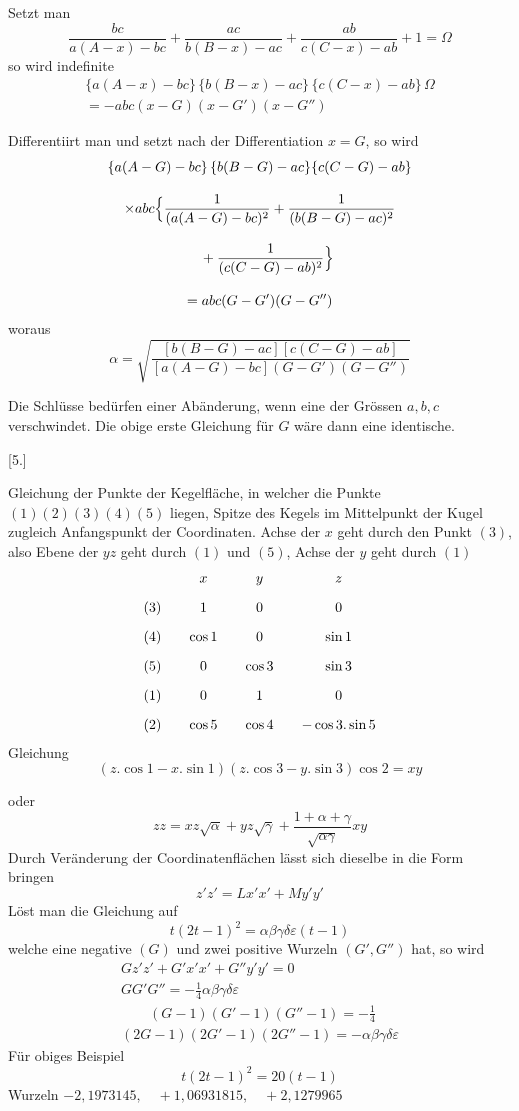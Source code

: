 
Setzt man
\[
\frac{bc}{a(A-x)-bc}+\frac{ac}{b(B-x)-ac}+\frac{ab}{c(C-x)-ab}+1=\Omega
\]
so wird indefinite
\[
\begin{gathered} \{a(A-x)-bc\}\,\{b(B-x)-ac\}\,\{c(C-x)-ab\}\,\Omega\\[9pt] =-abc(x-G)(x-G')(x-G'') \end{gathered}
\]

Differentiirt man und setzt nach der Differentiation $x=G$, so wird
\[
\begin{gathered} \{a(A-G)-bc\}\,\{b(B-G)-ac\}\{c(C-G)-ab\}\\[9pt] \times abc\Bigl\{\frac{1}{(a(A-G)-bc)^2}+\frac{1}{(b(B-G)-ac)^2}\\[9pt]\quad{}+\frac{1}{(c(C-G)-ab)^2}\Bigr\}\\[9pt] =abc(G-G')(G-G'') \end{gathered}
\]
woraus
\[
\alpha=\surd{\frac{[b(B-G)-ac][c(C-G)-ab]}{[a(A-G)-bc](G-G')(G-G'')}}
\]

Die Schlüsse bedürfen einer Abänderung, wenn eine der Grössen $a,b,c$
verschwindet. Die obige erste Gleichung für $G$ wäre dann eine identische.

\par\medskip{}\centerline{[5.]}\nobreak\smallskip
Gleichung der Punkte der Kegelfläche, in welcher die Punkte $(1)(2)(3)(4)(5)$
liegen, Spitze des Kegels im Mittelpunkt der Kugel zugleich Anfangspunkt der
Coordinaten. Achse der $x$ geht durch den Punkt $(3)$, also Ebene der $yz$ geht
durch $(1)$ und $(5)$, Achse der $y$ geht durch $(1)$
\[
\begin{array}{c@{\qquad}c@{\qquad}c@{\qquad}c} &x&y&z\\[9pt] (3)&1&0&0\\[9pt] (4)&\cos1&0&\sin1\\[9pt] (5)&0&\cos3&\sin3\\[9pt] (1)&0&1&0\\[9pt] (2)&\cos5&\cos4&-\cos3\mathord{.}\sin5 \end{array}
\]
Gleichung
\[
(z\mathord{.}\cos1-x\mathord{.}\sin1)(z\mathord{.}\cos3-y\mathord{.}\sin3)\cos2=xy
\]



oder
\[
zz=xz\surd{\alpha}+yz\surd{\gamma}+\frac{1+\alpha+\gamma}{\surd{\alpha\gamma}}xy
\]
Durch Veränderung der Coordinatenflächen lässt sich dieselbe in die Form
bringen
\[
z'z'=Lx'x'+My'y'
\]
Löst man die Gleichung auf
\[
t(2t-1)^2=\alpha\beta\gamma\delta\varepsilon(t-1)
\]
welche eine negative $(G)$ und zwei positive Wurzeln $(G',G'')$ hat, so wird
\[
\begin{gathered} Gz'z'+G'x'x'+G''y'y'=0\\[9pt] GG'G''=-\tfrac14\alpha\beta\gamma\delta\varepsilon\\[9pt] \qquad(G-1)(G'-1)(G''-1)=-\tfrac14\\[9pt] (2G-1)(2G'-1)(2G''-1)=-\alpha\beta\gamma\delta\varepsilon \end{gathered}
\]
Für obiges Beispiel
\[
t(2t-1)^2=20(t-1)
\]
Wurzeln\quad
$-2{,}1973145,\quad+1{,}06931815,\quad+2{,}1279965$


